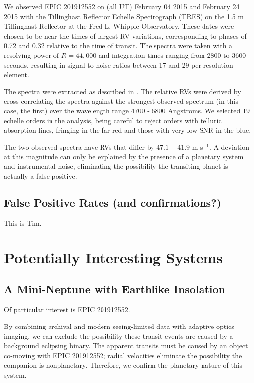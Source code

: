\documentclass{emulateapj}
\begin{document}
We observed EPIC 201912552 on (all UT) February 04 2015 and February 24 2015
with the Tillinghast Reflector Echelle
Spectrograph (TRES) on the 1.5 m Tillinghast Reflector at the Fred L.
Whipple Observatory.
These dates were chosen to be near the times of largest RV variations,
corresponding to phases of 0.72 and 0.32 relative to the time
of transit.
The spectra were taken with a resolving power of $R=44,000$ and
integration times ranging from 2800 to 3600 seconds, resulting in
signal-to-noise ratios between 17 and 29 per resolution element.

The spectra were extracted as described in \citet{Buchhave10}.
The relative RVs were derived by cross-correlating the spectra against the
strongest observed spectrum (in this case, the first) over the wavelength
range 4700 - 6800 Angstroms.
We selected 19 echelle orders in the analysis, being careful to reject
orders with telluric absorption lines, fringing in the far red and those
with very low SNR in the blue.

The two observed spectra have RVs that differ by $47.1 \pm 41.9$ m s$^{-1}$.
A deviation at this magnitude can only be explained by the presence of
a planetary system and instrumental noise, eliminating the possibility the
transiting planet is actually a false positive.



\subsection{False Positive Rates (and confirmations?)}
This is Tim.

\section{Potentially Interesting Systems}
\subsection{A Mini-Neptune with Earthlike Insolation}

Of particular interest is EPIC 201912552.

By combining archival and modern seeing-limited data with adaptive optics
imaging, we can exclude the possibility these transit events are caused by
a background eclipsing binary.
The apparent transits must be caused by an object co-moving with EPIC 201912552;
radial velocities eliminate the possibility the companion is nonplanetary.
Therefore, we confirm the planetary nature of this system.
\end{document}

